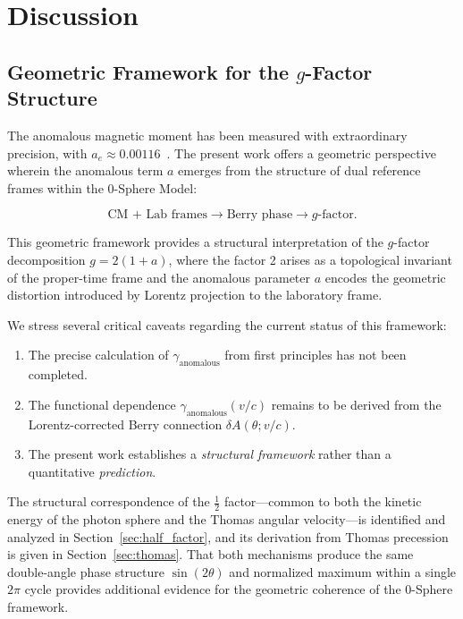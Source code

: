 \documentclass[%
 reprint,
 amsmath,amssymb,
 aps,
 prb,
]{revtex4-2}
\numberwithin{equation}{section}
\theoremstyle{definition}
\theoremstyle{remark}
\begin{document}
\section{Discussion}
\label{sec:discussion}

\subsection{Geometric Framework for the $g$-Factor Structure}

The anomalous magnetic moment has been measured with extraordinary precision, with $a_e \approx 0.00116$~\cite{Hanneke2008}. The present work offers a geometric perspective wherein the anomalous term $a$ emerges from the structure of dual reference frames within the 0-Sphere Model:

\begin{equation}
\text{CM + Lab frames} \to \text{Berry phase} \to g\text{-factor}.
\label{eq:conceptual_flow}
\end{equation}

This geometric framework provides a structural interpretation of the $g$-factor decomposition $g = 2(1+a)$, where the factor 2 arises as a topological invariant of the proper-time frame and the anomalous parameter $a$ encodes the geometric distortion introduced by Lorentz projection to the laboratory frame.

We stress several critical caveats regarding the current status of this framework:

\begin{enumerate}
\item The precise calculation of $\gamma_{\text{anomalous}}$ from first principles has not been completed.
\item The functional dependence $\gamma_{\text{anomalous}}(v/c)$ remains to be derived from the Lorentz-corrected Berry connection $\delta A(\theta; v/c)$.
\item The present work establishes a \emph{structural framework} rather than a quantitative \emph{prediction}.
\end{enumerate}

The structural correspondence of the $\frac{1}{2}$ factor---common to both the kinetic energy of the photon sphere and the Thomas angular velocity---is identified and analyzed in Section~\ref{sec:half_factor}, and its derivation from Thomas precession is given in Section~\ref{sec:thomas}. That both mechanisms produce the same double-angle phase structure $\sin(2\theta)$ and normalized maximum within a single $2\pi$ cycle provides additional evidence for the geometric coherence of the 0-Sphere framework.
\end{document}
